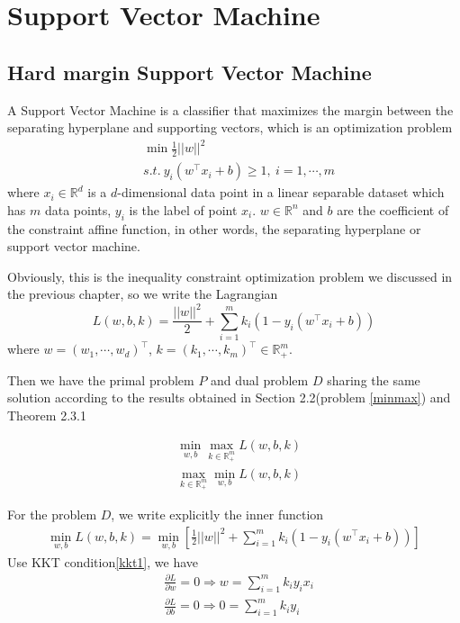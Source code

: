\documentclass[a4paper]{report}
\begin{document}
\chapter{Support Vector Machine}
\section{Hard margin Support Vector Machine}

A Support Vector Machine is a classifier that maximizes the margin between the separating hyperplane and supporting vectors\cite{cortes1995support}, which is an optimization problem 
\begin{align*}
    &\min \frac{1}{2}||w||^2\\
    &s.t. \ y_i(w^\top x_i+b)\geq 1, \ i=1,\cdots,m
\end{align*}
where $x_i\in \mathbb R^d$ is a $d$-dimensional data point in a linear separable dataset which has $m$ data points, $y_i$ is the label of point $x_i$. $w\in \mathbb R^n$ and $b$ are the coefficient of the constraint affine function, in other words, the separating hyperplane or support vector machine. 

Obviously, this is the inequality constraint optimization problem we discussed in the previous chapter, so we write the Lagrangian
\[
    L(w,b,k)=\frac{||w||^2}{2}+\sum_{i=1}^m k_i(1-y_i(w^\top x_i+b))
\]
where $w=(w_1,\cdots,w_d)^\top$, $k=(k_1,\cdots,k_m)^\top\in\mathbb R_+^m$.

Then we have the primal problem $P$ and dual problem $D$ sharing the same solution according to the results obtained in Section 2.2(problem \ref{minmax}) and Theorem 2.3.1

\begin{align}
    &\min_{w,b} \max_{k\in\mathbb R_+^m} L(w,b,k) \tag{P}\\
    &\max_{k\in\mathbb R_+^m} \min_{w,b} L(w,b,k) \tag{D}
\end{align}

For the problem $D$, we write explicitly the inner function
\begin{align}
    \min_{w,b} L(w,b,k)=\min_{w,b}[\frac{1}{2}||w||^2+\sum_{i=1}^m k_i(1-y_i(w^\top x_i+b))]
\end{align}
Use KKT condition\ref{kkt1}, we have
\begin{align}
    &\frac{\partial L}{\partial w}=0\Rightarrow w=\sum_{i=1}^m k_i y_i x_i\\
    &\frac{\partial L}{\partial b}=0\Rightarrow 0=\sum_{i=1}^m k_i y_i
\end{align}
\end{document}

